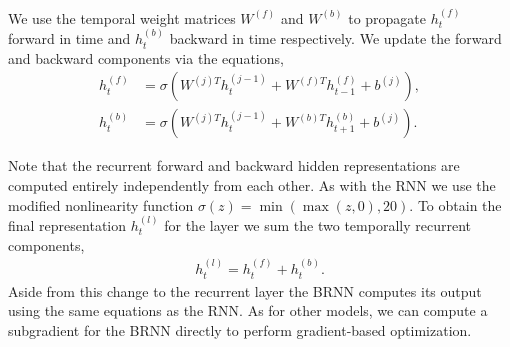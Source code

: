 We use the temporal weight matrices $W^{(f)}$ and $W^{(b)}$ to propagate
$h_t^{(f)}$ forward in time and $h_t^{(b)}$ backward in time respectively. We
update the forward and backward components via the equations,
\begin{align*}
    h^{(f)}_t &= \sigma(W^{(j)T} h^{(j-1)}_t +  W^{(f)T} h^{(f)}_{t-1} + b^{(j)}), \\
    h^{(b)}_t &= \sigma(W^{(j)T} h^{(j-1)}_t +  W^{(b)T} h^{(b)}_{t+1} + b^{(j)}).
\end{align*}

Note that the recurrent forward and backward hidden representations are
computed entirely independently from each other. As with the RNN we use the
modified nonlinearity function $\sigma(z) = \min( \max (z,0), 20)$. To obtain
the final representation $h^{(l)}_t$ for the layer we sum the two temporally
recurrent components,
\begin{align*}
  h^{(l)}_t = h^{(f)}_t + h^{(b)}_t.
\end{align*}
Aside from this change to the recurrent layer the BRNN computes its output
using the same equations as the RNN. As for other models, we can compute a
subgradient for the BRNN directly to perform gradient-based optimization.
